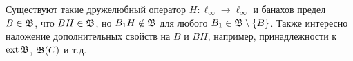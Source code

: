 \begin{hypothesis}
	Существуют такие дружелюбный оператор $H:\ell_\infty\to\ell_\infty$ и банахов предел $B\in \mathfrak{B}$,
	что $BH \in \mathfrak{B}$, но $B_1 H \notin \mathfrak{B}$ для любого $B_1\in \mathfrak{B}\setminus\{B\}$.
	Также интересно наложение дополнительных свойств на $B$ и $BH$, например, принадлежности к $\operatorname{ext}\mathfrak{B}$, $\mathfrak{B}(C)$ и т.д.
\end{hypothesis}
